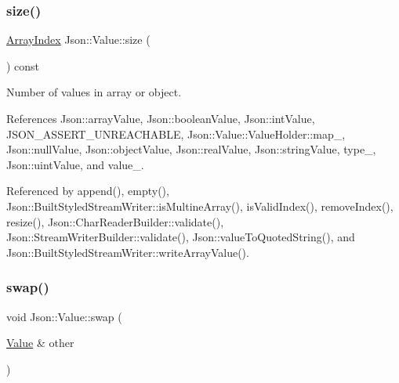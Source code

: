 \mbox{\label{classJson_1_1Value_a0ec2808e1d7efa4e9fad938d6667be44_a0ec2808e1d7efa4e9fad938d6667be44}} 
\subsubsection{\texorpdfstring{size()}{size()}}
{\footnotesize\ttfamily \hyperlink{classJson_1_1Value_a184a91566cccca7b819240f0d5561c7d_a184a91566cccca7b819240f0d5561c7d}{Array\+Index} Json\+::\+Value\+::size (\begin{DoxyParamCaption}{ }\end{DoxyParamCaption}) const}



Number of values in array or object. 



References Json\+::array\+Value, Json\+::boolean\+Value, Json\+::int\+Value, J\+S\+O\+N\+\_\+\+A\+S\+S\+E\+R\+T\+\_\+\+U\+N\+R\+E\+A\+C\+H\+A\+B\+LE, Json\+::\+Value\+::\+Value\+Holder\+::map\+\_\+, Json\+::null\+Value, Json\+::object\+Value, Json\+::real\+Value, Json\+::string\+Value, type\+\_\+, Json\+::uint\+Value, and value\+\_\+.



Referenced by append(), empty(), Json\+::\+Built\+Styled\+Stream\+Writer\+::is\+Multine\+Array(), is\+Valid\+Index(), remove\+Index(), resize(), Json\+::\+Char\+Reader\+Builder\+::validate(), Json\+::\+Stream\+Writer\+Builder\+::validate(), Json\+::value\+To\+Quoted\+String(), and Json\+::\+Built\+Styled\+Stream\+Writer\+::write\+Array\+Value().

\mbox{\label{classJson_1_1Value_aab841120d78e296e1bc06a373345e822_aab841120d78e296e1bc06a373345e822}} 
\subsubsection{\texorpdfstring{swap()}{swap()}}
{\footnotesize\ttfamily void Json\+::\+Value\+::swap (\begin{DoxyParamCaption}\item[{\hyperlink{classJson_1_1Value}{Value} \&}]{other }\end{DoxyParamCaption})}



